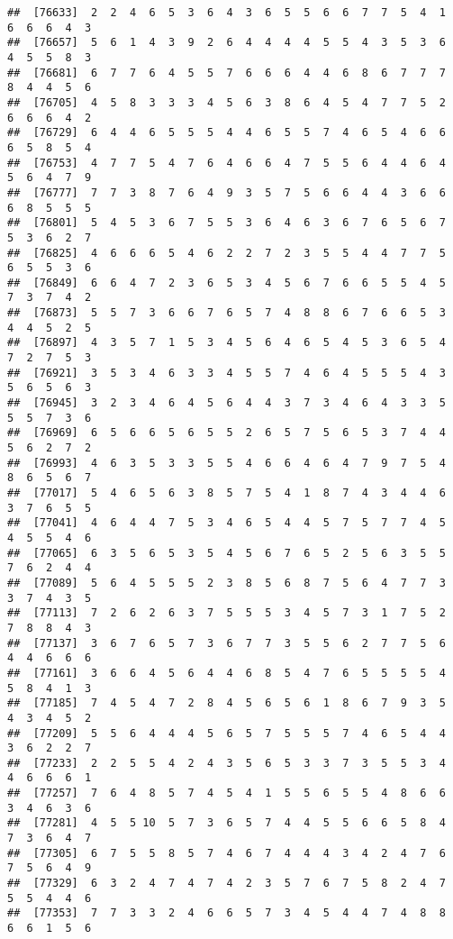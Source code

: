 \documentclass[
]{book}
\begin{document}
\begin{verbatim}
##  [76633]  2  2  4  6  5  3  6  4  3  6  5  5  6  6  7  7  5  4  1  6  6  6  4  3
##  [76657]  5  6  1  4  3  9  2  6  4  4  4  4  5  5  4  3  5  3  6  4  5  5  8  3
##  [76681]  6  7  7  6  4  5  5  7  6  6  6  4  4  6  8  6  7  7  7  8  4  4  5  6
##  [76705]  4  5  8  3  3  3  4  5  6  3  8  6  4  5  4  7  7  5  2  6  6  6  4  2
##  [76729]  6  4  4  6  5  5  5  4  4  6  5  5  7  4  6  5  4  6  6  6  5  8  5  4
##  [76753]  4  7  7  5  4  7  6  4  6  6  4  7  5  5  6  4  4  6  4  5  6  4  7  9
##  [76777]  7  7  3  8  7  6  4  9  3  5  7  5  6  6  4  4  3  6  6  6  8  5  5  5
##  [76801]  5  4  5  3  6  7  5  5  3  6  4  6  3  6  7  6  5  6  7  5  3  6  2  7
##  [76825]  4  6  6  6  5  4  6  2  2  7  2  3  5  5  4  4  7  7  5  6  5  5  3  6
##  [76849]  6  6  4  7  2  3  6  5  3  4  5  6  7  6  6  5  5  4  5  7  3  7  4  2
##  [76873]  5  5  7  3  6  6  7  6  5  7  4  8  8  6  7  6  6  5  3  4  4  5  2  5
##  [76897]  4  3  5  7  1  5  3  4  5  6  4  6  5  4  5  3  6  5  4  7  2  7  5  3
##  [76921]  3  5  3  4  6  3  3  4  5  5  7  4  6  4  5  5  5  4  3  5  6  5  6  3
##  [76945]  3  2  3  4  6  4  5  6  4  4  3  7  3  4  6  4  3  3  5  5  5  7  3  6
##  [76969]  6  5  6  6  5  6  5  5  2  6  5  7  5  6  5  3  7  4  4  5  6  2  7  2
##  [76993]  4  6  3  5  3  3  5  5  4  6  6  4  6  4  7  9  7  5  4  8  6  5  6  7
##  [77017]  5  4  6  5  6  3  8  5  7  5  4  1  8  7  4  3  4  4  6  3  7  6  5  5
##  [77041]  4  6  4  4  7  5  3  4  6  5  4  4  5  7  5  7  7  4  5  4  5  5  4  6
##  [77065]  6  3  5  6  5  3  5  4  5  6  7  6  5  2  5  6  3  5  5  7  6  2  4  4
##  [77089]  5  6  4  5  5  5  2  3  8  5  6  8  7  5  6  4  7  7  3  3  7  4  3  5
##  [77113]  7  2  6  2  6  3  7  5  5  5  3  4  5  7  3  1  7  5  2  7  8  8  4  3
##  [77137]  3  6  7  6  5  7  3  6  7  7  3  5  5  6  2  7  7  5  6  4  4  6  6  6
##  [77161]  3  6  6  4  5  6  4  4  6  8  5  4  7  6  5  5  5  5  4  5  8  4  1  3
##  [77185]  7  4  5  4  7  2  8  4  5  6  5  6  1  8  6  7  9  3  5  4  3  4  5  2
##  [77209]  5  5  6  4  4  4  5  6  5  7  5  5  5  7  4  6  5  4  4  3  6  2  2  7
##  [77233]  2  2  5  5  4  2  4  3  5  6  5  3  3  7  3  5  5  3  4  4  6  6  6  1
##  [77257]  7  6  4  8  5  7  4  5  4  1  5  5  6  5  5  4  8  6  6  3  4  6  3  6
##  [77281]  4  5  5 10  5  7  3  6  5  7  4  4  5  5  6  6  5  8  4  7  3  6  4  7
##  [77305]  6  7  5  5  8  5  7  4  6  7  4  4  4  3  4  2  4  7  6  7  5  6  4  9
##  [77329]  6  3  2  4  7  4  7  4  2  3  5  7  6  7  5  8  2  4  7  5  5  4  4  6
##  [77353]  7  7  3  3  2  4  6  6  5  7  3  4  5  4  4  7  4  8  8  6  6  1  5  6

\end{verbatim}
\end{document}
